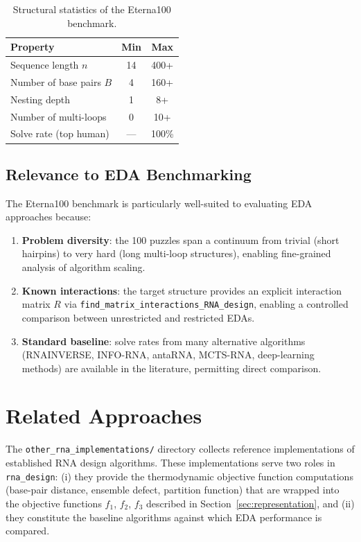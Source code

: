 \documentclass[11pt,a4paper]{article}
\begin{document}
\begin{table}[h]
\centering
\caption{Structural statistics of the Eterna100 benchmark.}
\label{tab:eterna}
\begin{tabular}{lcc}
\toprule
\textbf{Property} & \textbf{Min} & \textbf{Max} \\
\midrule
Sequence length $n$          & 14   & 400+  \\
Number of base pairs $B$     & 4    & 160+  \\
Nesting depth                & 1    & 8+    \\
Number of multi-loops        & 0    & 10+   \\
Solve rate (top human)       & ---  & 100\% \\
\bottomrule
\end{tabular}
\end{table}

\subsection{Relevance to EDA Benchmarking}

The Eterna100 benchmark is particularly well-suited to evaluating EDA
approaches because:
\begin{enumerate}
  \item \textbf{Problem diversity}: the 100 puzzles span a continuum from
    trivial (short hairpins) to very hard (long multi-loop structures),
    enabling fine-grained analysis of algorithm scaling.
  \item \textbf{Known interactions}: the target structure provides an
    explicit interaction matrix $R$ via
    \texttt{find\_matrix\_interactions\_RNA\_design}, enabling a controlled
    comparison between unrestricted and restricted EDAs.
  \item \textbf{Standard baseline}: solve rates from many alternative
    algorithms (RNAINVERSE, INFO-RNA, antaRNA, MCTS-RNA, deep-learning
    methods) are available in the literature, permitting direct comparison.
\end{enumerate}

\section{Related Approaches}
\label{sec:related}

The \texttt{other\_rna\_implementations/} directory collects reference
implementations of established RNA design algorithms. These implementations
serve two roles in \texttt{rna\_design}: (i) they provide the
thermodynamic objective function computations (base-pair distance, ensemble
defect, partition function) that are wrapped into the objective functions
$f_1$, $f_2$, $f_3$ described in Section~\ref{sec:representation}, and (ii)
they constitute the baseline algorithms against which EDA performance is
compared.
\end{document}
